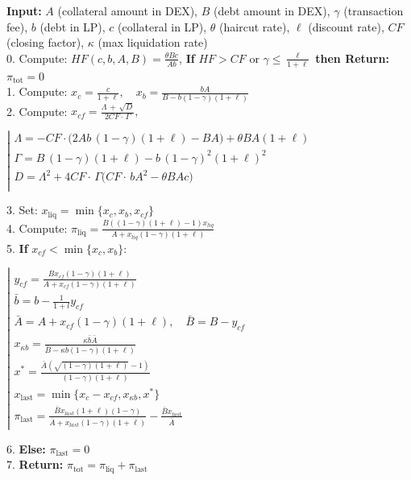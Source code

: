 \documentclass[11pt]{article} %
\begin{document}
\begin{algorithm}[t]
\caption{\textbf{Liquidation Profit Dynamics $L(CF, \kappa)$}}
\label{algo:pi_liq}
\textbf{Input:} $A$ (collateral amount in DEX), $B$ (debt amount in DEX), $\gamma$ (transaction fee), $b$ (debt in LP), $c$ (collateral in LP), $\theta$ (haircut rate), $\ell$ (discount rate), $CF$ (closing factor), $\kappa$ (max liquidation rate) \\
0. Compute: $HF(c,b,A,B)=\frac{\theta B c}{A b}$, \textbf{If} $HF>CF$ or $\gamma\leq\frac{\ell}{1+\ell}$ \textbf{then Return:} $\pi_{\text{tot}} = 0$\\
1. Compute: $x_c = \frac{c}{1+\ell}, \quad x_b = \frac{bA}{B - b(1-\gamma)(1+\ell)}$\\
2. Compute: $x_{cf} = 
\frac{\Lambda \,+\, \sqrt{D}}{2CF\cdot\,\Gamma},$
\begin{flushleft}
$\left|\begin{array}{l}
\Lambda = -CF\cdot\bigl(2Ab\,(1-\gamma)(1+\ell) - BA\bigr)+ \theta BA(1+\ell)\\
\Gamma = B\,(1-\gamma)(1+\ell) - b\,(1-\gamma)^2(1+\ell)^2\\
D = \Lambda^2 + 4CF\cdot\,\Gamma\bigl(CF\cdot\,bA^2 - \theta BA c\bigr)\\ 
\end{array}\right.$
\end{flushleft}
3. Set: $x_{\text{liq}} = \min\{x_c, x_b, x_{cf}\}$ \\
4. Compute: $\pi_{\text{liq}} = \frac{B((1-\gamma)(1+\ell)-1)x_{liq} }{A+ x_{liq}(1-\gamma)(1+\ell)}$\\ 
5. \textbf{If} $x_{cf} < \min\{x_c, x_b\}$:
\begin{flushleft}
$\left|\begin{array}{l}
y_{cf} =\frac{Bx_{cf}(1-\gamma)(1+\ell)}{A+x_{cf}(1-\gamma)(1+\ell)} \\
\bar{b} = b - \frac{1}{1+l} y_{cf}\\
\bar{A} = A + x_{cf}(1-\gamma)(1+\ell),\quad \bar{B} = B - y_{cf}\\
x_{\kappa b} = \frac{\kappa \bar{b}\bar{A}}{\bar{B} - \kappa \bar{b}(1-\gamma)(1+\ell)}\\
x^*=\frac{\bar{A}(\sqrt{(1-\gamma)(1+\ell)} - 1)}{(1-\gamma)(1+\ell)}\\ x_{\text{last}} = \min\{x_c-x_{cf}, x_{\kappa b}, x^*\}\\
\pi_{\text{last}} = \frac{\bar{B}x_{last}(1+\ell)(1-\gamma)}{\bar{A}+x_{last}(1-\gamma)(1+\ell)}-\frac{\bar{B}x_{last}}{\bar{A}}
\end{array}\right.$
\end{flushleft}
6. \textbf{Else:} $\pi_{\text{last}} = 0$ \\
7. \textbf{Return:} $\pi_{\text{tot}} = \pi_{\text{liq}} + \pi_{\text{last}}$
\end{algorithm}
\end{document}
